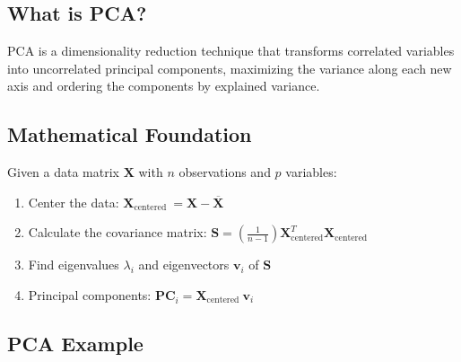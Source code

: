 \documentclass[
]{article}
\begin{document}
\subsection{What is PCA?}

PCA is a dimensionality reduction technique that transforms correlated
variables into uncorrelated principal components, maximizing the
variance along each new axis and ordering the components by explained
variance.

\subsection{Mathematical Foundation}

Given a data matrix \(\mathbf{X}\) with \(n\) observations and \(p\)
variables:

\begin{enumerate}
\item
  Center the data:
  \(\mathbf{X}_{\text{centered }} = \mathbf{X} - \overline{\mathbf{X}}\)
\item
  Calculate the covariance matrix:
  \(\mathbf{S} = \left( \frac{1}{n - 1} \right)\mathbf{X}_{\text{centered}}^{T}\mathbf{X}_{\text{centered}}\)
\item
  Find eigenvalues \(\lambda_{i}\) and eigenvectors \(\mathbf{v}_{i}\)
  of \(\mathbf{S}\)
\item
  Principal components:
  \(\mathbf{\text{PC}}_{i} = \mathbf{X}_{\text{centered }}\mathbf{v}_{i}\)
\end{enumerate}

\subsection{PCA Example}
\end{document}

